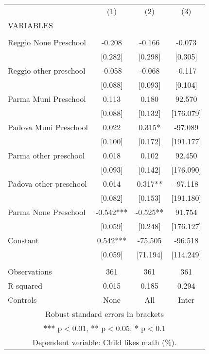 \begin{tabular}{lccc} \hline
 & (1) & (2) & (3) \\
VARIABLES &  &  &  \\ \hline
 &  &  &  \\
Reggio None Preschool & -0.208 & -0.166 & -0.073 \\
 & [0.282] & [0.298] & [0.305] \\
Reggio other preschool & -0.058 & -0.068 & -0.117 \\
 & [0.088] & [0.093] & [0.104] \\
Parma Muni Preschool & 0.113 & 0.180 & 92.570 \\
 & [0.088] & [0.132] & [176.079] \\
Padova Muni Preschool & 0.022 & 0.315* & -97.089 \\
 & [0.100] & [0.172] & [191.177] \\
Parma other preschool & 0.018 & 0.102 & 92.450 \\
 & [0.093] & [0.142] & [176.090] \\
Padova other preschool & 0.014 & 0.317** & -97.118 \\
 & [0.082] & [0.153] & [191.180] \\
Parma None Preschool & -0.542*** & -0.525** & 91.754 \\
 & [0.059] & [0.248] & [176.127] \\
Constant & 0.542*** & -75.505 & -96.518 \\
 & [0.059] & [71.194] & [114.249] \\
 &  &  &  \\
Observations & 361 & 361 & 361 \\
R-squared & 0.015 & 0.185 & 0.294 \\
 Controls & None & All & Inter \\ \hline
\multicolumn{4}{c}{ Robust standard errors in brackets} \\
\multicolumn{4}{c}{ *** p$<$0.01, ** p$<$0.05, * p$<$0.1} \\
\multicolumn{4}{c}{ Dependent variable: Child likes math (\%).} \\
\end{tabular}
